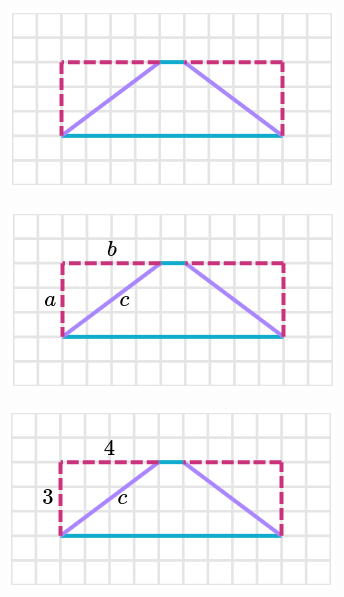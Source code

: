 \begin{solutionbox}{9.5cm}\footnotesize
    \begin{minipage}{0.4\textwidth}
        \begin{multicols}{2}
            \begin{figure}[H]
                \centering
                \includegraphics[width=\linewidth]{../images/peri_trap_03a.png}
                \caption{}
                \label{fig:peri_trap_03a}
            \end{figure}
            \begin{figure}[H]
                \centering
                \includegraphics[width=\linewidth]{../images/peri_trap_03b.png}
                \caption{}
                \label{fig:peri_trap_03b}
            \end{figure}
            \begin{figure}[H]
                \centering
                \includegraphics[width=\linewidth]{../images/peri_trap_03c.png}

\end{figure}
\end{multicols}
\end{minipage}
\end{solutionbox}
